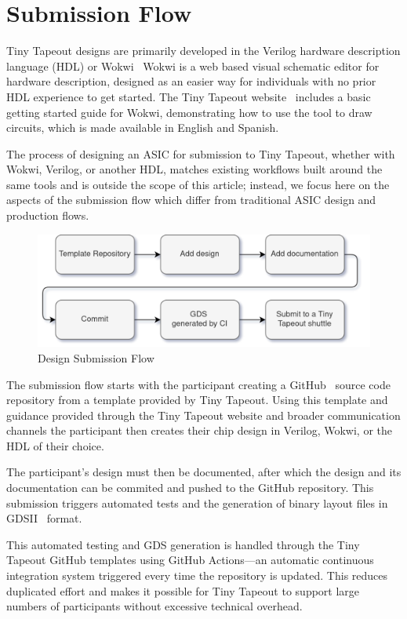 \section{Submission Flow}
\label{sec:design_flow}

Tiny Tapeout designs are primarily developed in the Verilog hardware description language (HDL) or Wokwi~\cite{wokwi}
Wokwi is a web based visual schematic editor for hardware description, designed as an easier way for individuals with no prior HDL experience to get started.
The Tiny Tapeout website~\cite{tinytapeout} includes a basic getting started guide for Wokwi, demonstrating how to use the tool to draw circuits, which is made available in English and Spanish.

The process of designing an ASIC for submission to Tiny Tapeout, whether with Wokwi, Verilog, or another HDL, matches existing workflows built around the same tools and is outside the scope of this article; instead, we focus here on the aspects of the submission flow which differ from traditional ASIC design and production flows.

\begin{figure}[!t]
\centering
\includegraphics[width=\columnwidth]{./Figs/submission_flow.png}
\caption{Design Submission Flow}
\label{fig:submission_flow}
\end{figure}

The submission flow starts with the participant creating a GitHub~\cite{github} source code repository from a template provided by Tiny Tapeout. Using this template and guidance provided through the Tiny Tapeout website and broader communication channels the participant then creates their chip design in Verilog, Wokwi, or the HDL of their choice.

The participant's design must then be documented, after which the design and its documentation can be commited and pushed to the GitHub repository. This submission triggers automated tests and the generation of binary layout files in GDSII~\cite{gds} format.

This automated testing and GDS generation is handled through the Tiny Tapeout GitHub templates\cite{verilogtemplate} using GitHub Actions\cite{githubactions}---an automatic continuous integration system triggered every time the repository is updated. This reduces duplicated effort and makes it possible for Tiny Tapeout to support large numbers of participants without excessive technical overhead.

